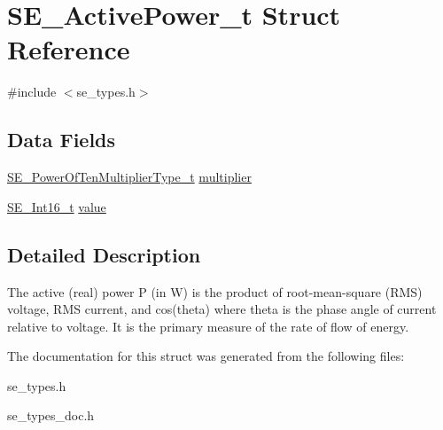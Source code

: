 \hypertarget{structSE__ActivePower__t}{}\section{S\+E\+\_\+\+Active\+Power\+\_\+t Struct Reference}
\label{structSE__ActivePower__t}


{\ttfamily \#include $<$se\+\_\+types.\+h$>$}

\subsection*{Data Fields}
\begin{DoxyCompactItemize}
\item 
\hyperlink{group__PowerOfTenMultiplierType_gaf0317b781dc8dbb9cb6ac4e44a14fdef}{S\+E\+\_\+\+Power\+Of\+Ten\+Multiplier\+Type\+\_\+t} \hyperlink{group__ActivePower_ga8c107ce3bb523188b57c5e718b56d366}{multiplier}
\item 
\hyperlink{group__Int16_ga0d600c7df811a7d4b4816e8965877690}{S\+E\+\_\+\+Int16\+\_\+t} \hyperlink{group__ActivePower_ga9dac3ce1ec5e44a9caa1a819582960d2}{value}
\end{DoxyCompactItemize}


\subsection{Detailed Description}
The active (real) power P (in W) is the product of root-\/mean-\/square (R\+MS) voltage, R\+MS current, and cos(theta) where theta is the phase angle of current relative to voltage. It is the primary measure of the rate of flow of energy. 

The documentation for this struct was generated from the following files\+:\begin{DoxyCompactItemize}
\item 
se\+\_\+types.\+h\item 
se\+\_\+types\+\_\+doc.\+h\end{DoxyCompactItemize}
